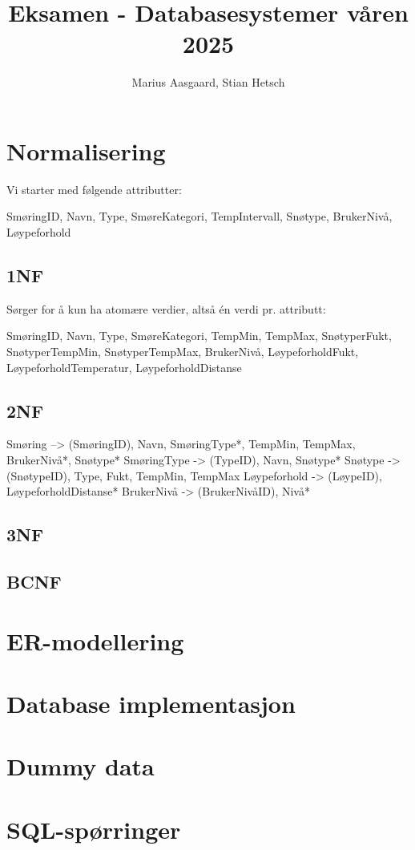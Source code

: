 \documentclass[12pt, a4paper]{article}
\title{Eksamen - Databasesystemer våren 2025}
\author{Marius Aasgaard, Stian Hetsch}
\begin{document}
\maketitle

\section{Normalisering}

Vi starter med følgende attributter:

SmøringID, Navn, Type, SmøreKategori, TempIntervall, Snøtype, BrukerNivå, Løypeforhold

\subsection{1NF}

Sørger for å kun ha atomære verdier, altså én verdi pr. attributt:

SmøringID, Navn, Type, SmøreKategori, TempMin, TempMax, SnøtyperFukt, SnøtyperTempMin, SnøtyperTempMax, BrukerNivå, LøypeforholdFukt, LøypeforholdTemperatur, LøypeforholdDistanse 

\subsection{2NF}

Smøring --> (SmøringID), Navn, SmøringType*, TempMin, TempMax, BrukerNivå*, Snøtype*
SmøringType -> (TypeID), Navn, Snøtype*
Snøtype -> (SnøtypeID), Type, Fukt, TempMin, TempMax
Løypeforhold -> (LøypeID), LøypeforholdDistanse*
BrukerNivå -> (BrukerNivåID), Nivå*

\subsection{3NF}



\subsection{BCNF}

\section{ER-modellering}

\section{Database implementasjon}

\section{Dummy data}

\section{SQL-spørringer}

\end{document}
